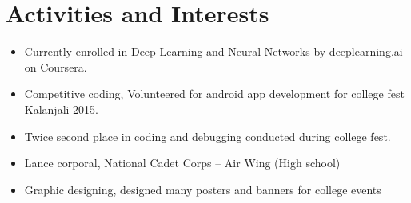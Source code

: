 \documentclass[11pt]{article}
\begin{document}
\section{Activities and Interests}
\begin{itemize}
        \itemsep0em
    \item
        Currently enrolled in Deep Learning and Neural Networks by
        deeplearning.ai on Coursera.
    \item
        Competitive coding, Volunteered for android app development for
        college fest Kalanjali-2015.
    \item
        Twice second place in coding and debugging conducted during
        college fest.
    \item
        Lance corporal, National Cadet Corps – Air Wing (High school)
    \item
        Graphic designing, designed many posters and banners for college
        events
\end{itemize}
\end{document}
